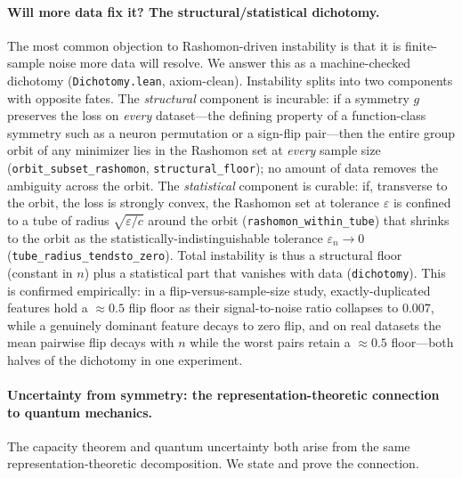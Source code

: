 \documentclass[11pt,a4paper]{article}
\begin{document}
\paragraph{Will more data fix it? The structural/statistical dichotomy.}
The most common objection to Rashomon-driven instability is that it is finite-sample noise more data
will resolve.  We answer this as a machine-checked dichotomy (\texttt{Dichotomy.lean}, axiom-clean).
Instability splits into two components with opposite fates.  The \emph{structural} component is
incurable: if a symmetry $g$ preserves the loss on \emph{every} dataset---the defining property of a
function-class symmetry such as a neuron permutation or a sign-flip pair---then the entire group orbit
of any minimizer lies in the Rashomon set at \emph{every} sample size
(\texttt{orbit\_subset\_rashomon}, \texttt{structural\_floor}); no amount of data removes the ambiguity
across the orbit.  The \emph{statistical} component is curable: if, transverse to the orbit, the loss
is strongly convex, the Rashomon set at tolerance $\varepsilon$ is confined to a tube of radius
$\sqrt{\varepsilon/c}$ around the orbit (\texttt{rashomon\_within\_tube}) that shrinks to the orbit as
the statistically-indistinguishable tolerance $\varepsilon_n \to 0$
(\texttt{tube\_radius\_tendsto\_zero}).  Total instability is thus a structural floor (constant in $n$)
plus a statistical part that vanishes with data (\texttt{dichotomy}).  This is confirmed empirically:
in a flip-versus-sample-size study, exactly-duplicated features hold a $\approx 0.5$ flip floor as
their signal-to-noise ratio collapses to $0.007$, while a genuinely dominant feature decays to zero
flip, and on real datasets the mean pairwise flip decays with $n$ while the worst pairs retain a
$\approx 0.5$ floor---both halves of the dichotomy in one experiment.

\paragraph{Uncertainty from symmetry: the representation-theoretic connection to quantum mechanics.}
The capacity theorem and quantum uncertainty both arise from the same representation-theoretic decomposition.  We state and prove the connection.
\end{document}
